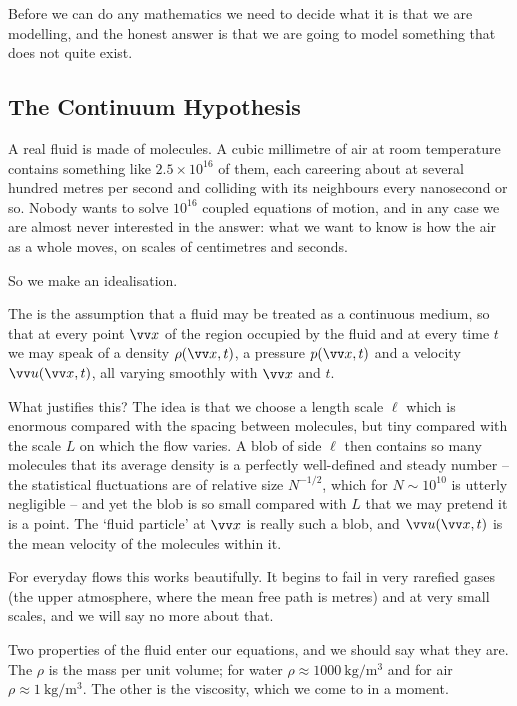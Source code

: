 Before we can do any mathematics we need to decide what it is that we are modelling, and the honest answer is that we are going to model something that does not quite exist.

\subsection{The Continuum Hypothesis}

A real fluid is made of molecules. A cubic millimetre of air at room temperature contains something like $2.5 \times 10^{16}$ of them, each careering about at several hundred metres per second and colliding with its neighbours every nanosecond or so. Nobody wants to solve $10^{16}$ coupled equations of motion, and in any case we are almost never interested in the answer: what we want to know is how the air as a whole moves, on scales of centimetres and seconds.

So we make an idealisation.

\begin{definition}
	The  is the assumption that a fluid may be treated as a continuous medium, so that at every point $\vv x$ of the region occupied by the fluid and at every time $t$ we may speak of a density $\rho(\vv x, t)$, a pressure $p(\vv x, t)$ and a velocity $\vv u (\vv x, t)$, all varying smoothly with $\vv x$ and $t$.
\end{definition}

What justifies this? The idea is that we choose a length scale $\ell$ which is enormous compared with the spacing between molecules, but tiny compared with the scale $L$ on which the flow varies. A blob of side $\ell$ then contains so many molecules that its average density is a perfectly well-defined and steady number -- the statistical fluctuations are of relative size $N^{-1/2}$, which for $N \sim 10^{10}$ is utterly negligible -- and yet the blob is so small compared with $L$ that we may pretend it is a point. The `fluid particle' at $\vv x$ is really such a blob, and $\vv u(\vv x, t)$ is the mean velocity of the molecules within it.

For everyday flows this works beautifully. It begins to fail in very rarefied gases (the upper atmosphere, where the mean free path is metres) and at very small scales, and we will say no more about that.

Two properties of the fluid enter our equations, and we should say what they are. The  $\rho$ is the mass per unit volume; for water $\rho \approx \SI{1000}{\kilo\gram\per\meter\cubed}$ and for air $\rho \approx \SI{1}{\kilo\gram\per\meter\cubed}$. The other is the viscosity, which we come to in a moment.

